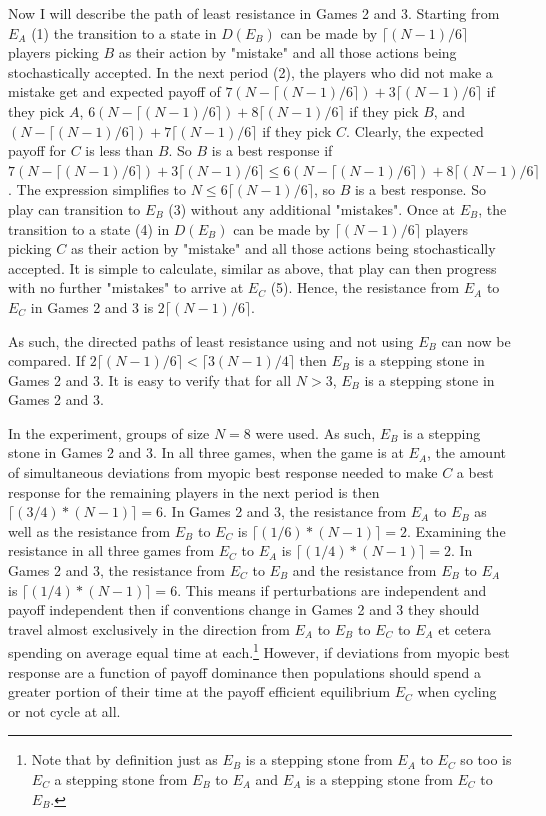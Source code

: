 Now I will describe the path of least resistance in Games 2 and 3. Starting from $E_A$ (1) the transition to a state in $D(E_B)$ can be made by $\lceil(N-1)/6 \rceil$ players picking $B$ as their action by "mistake" and all those actions being stochastically accepted. In the next period (2), the players who did not make a mistake get and expected payoff of $7(N-\lceil(N-1)/6 \rceil) + 3\lceil(N-1)/6 \rceil$ if they pick $A$, $6(N-\lceil(N-1)/6 \rceil) + 8\lceil(N-1)/6 \rceil$ if they pick $B$, and $(N-\lceil(N-1)/6 \rceil) + 7\lceil(N-1)/6 \rceil$ if they pick $C$. Clearly, the expected payoff for $C$ is less than $B$. So $B$ is a best response if $7(N-\lceil(N-1)/6 \rceil) + 3\lceil(N-1)/6 \rceil \leq 6(N-\lceil(N-1)/6 \rceil) + 8\lceil(N-1)/6 \rceil$. The expression simplifies to $N \leq  6\lceil(N-1)/6 \rceil$, so $B$ is a best response. So play can transition to $E_B$ (3) without any additional "mistakes". Once at $E_B$, the transition to a state (4) in $D(E_B)$ can be made by $\lceil(N-1)/6 \rceil$ players picking $C$ as their action by "mistake" and all those actions being stochastically accepted. It is simple to calculate, similar as above, that play can then progress with no further "mistakes" to arrive at $E_C$ (5). Hence, the resistance from $E_A$ to $E_C$ in Games 2 and 3 is $2\lceil(N-1)/6 \rceil$.

As such, the directed paths of least resistance using and not using $E_B$ can now be compared. If $2\lceil(N-1)/6 \rceil < \lceil3(N-1)/4 \rceil$ then $E_B$ is a stepping stone in Games 2 and 3. It is easy to verify that for all $N >3$, $E_B$ is a stepping stone in Games 2 and 3. 


In the experiment, groups of size $N = 8$ were used. As such, $E_B$ is a stepping stone in Games 2 and 3. In all three games, when the game is at $E_A$, the amount of simultaneous deviations from myopic best response needed to make $C$ a best response for the remaining players in the next period is then $\lceil(3/4)*(N-1)\rceil = 6$. In Games 2 and 3, the resistance from $E_A$ to $E_B$ as well as the resistance from $E_B$ to $E_C$ is $\lceil(1/6)*(N-1)\rceil = 2$. Examining the resistance in all three games from $E_C$ to $E_A$ is $\lceil(1/4)*(N-1)\rceil = 2$. In Games 2 and 3, the resistance from $E_C$ to $E_B$ and the resistance from $E_B$ to $E_A$ is $\lceil(1/4)*(N-1)\rceil = 6$. This means if perturbations are independent and payoff independent then if conventions change in Games 2 and 3 they should travel almost exclusively in the direction from $E_A$ to $E_B$ to $E_C$ to $E_A$ et cetera spending on average equal time at each.\footnote{Note that by definition just as $E_B$ is a stepping stone from $E_A$ to $E_C$ so too is $E_C$ a stepping stone from $E_B$ to $E_A$ and $E_A$ is a stepping stone from $E_C$ to $E_B$.} However, if deviations from myopic best response are a function of payoff dominance then populations should spend a greater portion of their time at the payoff efficient equilibrium $E_C$ when cycling or not cycle at all. 


